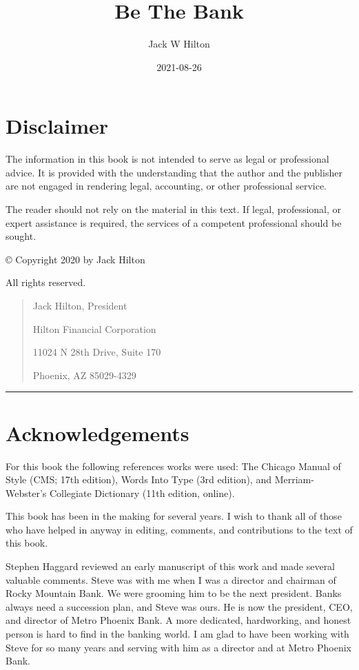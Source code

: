 \documentclass[
]{book}
\title{Be The Bank}
\author{Jack W Hilton}
\date{2021-08-26}
\begin{document}
\maketitle

{
\setcounter{tocdepth}{1}
\tableofcontents
}
\hypertarget{disclaimer}{%
\chapter*{Disclaimer}\label{disclaimer}}


The information in this book is not intended to serve as legal or professional advice. It is provided with the understanding that the author and the publisher are not engaged in rendering legal, accounting, or other professional service.

The reader should not rely on the material in this text. If legal, professional, or expert assistance is required, the services of a competent professional should be sought.

© Copyright 2020 by Jack Hilton

All rights reserved.

\begin{quote}
Jack Hilton, President

Hilton Financial Corporation

11024 N 28th Drive, Suite 170

Phoenix, AZ 85029-4329
\end{quote}

\begin{center}\rule{0.5\linewidth}{0.5pt}\end{center}

\hypertarget{acknowledgements}{%
\chapter*{Acknowledgements}\label{acknowledgements}}


For this book the following references works were used: The Chicago Manual of Style (CMS; 17th edition), Words Into Type (3rd edition), and Merriam-Webster's Collegiate Dictionary (11th edition, online).

This book has been in the making for several years. I wish to thank all of those who have helped in anyway in editing, comments, and contributions to the text of this book.

Stephen Haggard reviewed an early manuscript of this work and made several valuable comments. Steve was with me when I was a director and chairman of Rocky Mountain Bank. We were grooming him to be the next president. Banks always need a succession plan, and Steve was ours. He is now the president, CEO, and director of Metro Phoenix Bank. A more dedicated, hardworking, and honest person is hard to find in the banking world. I am glad to have been working with Steve for so many years and serving with him as a director and at Metro Phoenix Bank.
\end{document}
